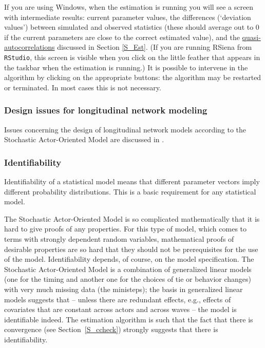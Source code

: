 \documentclass[a4paper,fleqn,11pt]{article}
\newcommand{\+}{\, + \,}
\newcommand{\RS}{{\sf \textsf{RSiena} }}
\newcommand{\SAOM}{{Stochastic Actor-Oriented Model }}
\begin{document}
If you are using Windows, when the estimation is running you will see a
screen with intermediate results: current parameter values, the
differences (`deviation values') between simulated and observed
statistics (these should average out to 0 if the current
parameters are close to the correct estimated value), and the
\hyperlink{T_quasiac}{quasi-autocorrelations} discussed in Section
\ref{S_Est}.
(If you are running \RS from \texttt{RStudio}, this screen is visible
when you click on the little feather that appears in the taskbar
when the estimation is running.)
It is possible to intervene in the algorithm by clicking on the
appropriate buttons:
the algorithm may be restarted or terminated. In most cases
this is not necessary.


\subsubsection{Design issues for longitudinal network modeling}

Issues concerning the design of longitudinal network models
according to the \SAOM are discussed in
\citet{StadfeldSnijdersSteglichVanDuijn2018}.

\subsubsection{Identifiability}

Identifiability of a statistical model means that different
parameter vectors imply different probability distributions.
This is a basic requirement for any statistical model.

The \SAOM is so complicated mathematically that it is hard to give
proofs of any properties.
For this type of model, which comes to terms with strongly dependent
random variables, mathematical proofs of desirable properties
are so hard that they should not be prerequisites for the use of the model.
Identifiability depends, of course, on the model specification.
The \SAOM is a combination of generalized linear models
(one for the timing and another one for the choices of tie or behavior changes)
with very much missing data (the ministeps);
the basis in generalized linear models suggests
that -- unless there are redundant effects, e.g.,
effects of covariates that are constant across actors and across
waves -- the model is identifiable indeed.
The estimation algorithm is such that the fact that there is convergence
(see Section~\ref{S_ccheck}) strongly suggests that there is identifiability.
\end{document}
